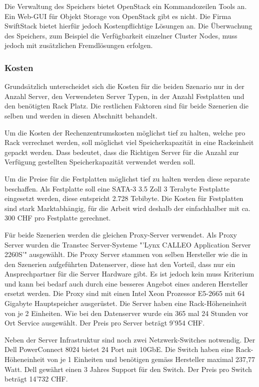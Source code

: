 Die Verwaltung des Speichers bietet OpenStack ein Kommandozeilen Tools an. Ein Web-GUI für Objekt Storage von OpenStack gibt es nicht. Die Firma SwiftStack bietet hierfür jedoch Kostenpflichtige Lösungen an. Die Überwachung des Speichers, zum Beispiel die Verfügbarkeit einzelner Cluster Nodes, muss jedoch mit zusätzlichen Fremdlösungen erfolgen. 

\subsubsection{Kosten}
Grundsätzlich unterscheidet sich die Kosten für die beiden Szenario nur in der Anzahl Server, den Verwendeten Server Typen, in der Anzahl Festplatten und den benötigten Rack Platz. Die restlichen Faktoren sind für beide Szenerien die selben und werden in diesen Abschnitt behandelt.

Um die Kosten der Rechenzentrumskosten möglichst tief zu halten, welche pro Rack verrechnet werden, soll möglichst viel Speicherkapazität in eine Rackeinheit gepackt werden. Dass bedeutet, dass die Richtigen Server für die Anzahl zur Verfügung gestellten Speicherkapazität verwendet werden soll.

Um die Preise für die Festplatten möglichst tief zu halten werden diese separate beschaffen. Als Festplatte soll eine SATA-3 3.5 Zoll 3 Terabyte Festplatte eingesetzt werden, diese entspricht 2.728 Tebibyte. Die Kosten für Festplatten sind stark Marktabhängig, für die Arbeit wird deshalb der einfachhalber mit ca. 300 CHF pro Festplatte gerechnet.

Für beide Szenerien werden die gleichen Proxy-Server verwendet. Als Proxy Server wurden die Transtec Server-Systeme "'Lynx CALLEO Application Server 2260S'" ausgewählt. Die Proxy Server stammen von selben Hersteller wie die in den Szenerien aufgeführten Datenserver, diese hat den Vorteil, dass nur ein Ansprechpartner für die Server Hardware gibt. Es ist jedoch kein muss Kriterium und kann bei bedarf auch durch eine besseres Angebot eines anderen Hersteller ersetzt werden. Die Proxy sind mit einen Intel Xeon Prozessor E5-2665 mit 64 Gigabyte Hauptspeicher ausgerüstet. Die Server haben eine Rack-Höheneinheit von je 2 Einheiten. Wie bei den Datenserver wurde ein 365 mal 24 Stunden vor Ort Service ausgewählt. Der Preis pro Server beträgt 9'954 CHF.

Neben der Server Infrastruktur sind noch zwei Netzwerk-Switches notwendig. Der Dell PowerConnect 8024 bietet 24 Port mit 10GbE. Die Switch haben eine Rack-Höheneinheit von je 1 Einheiten und benötigen gemäss Hersteller maximal 237,77 Watt. Dell gewährt einen 3 Jahres Support für den Switch. Der Preis pro Switch beträgt 14'732 CHF.

